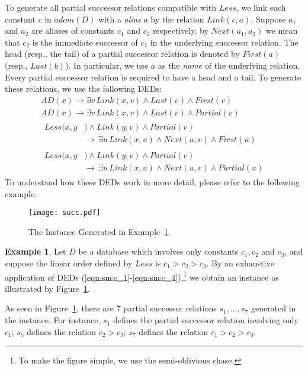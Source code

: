 \documentclass[letterpaper]{article} %
\theoremstyle{definition}
\theoremstyle{remark}
\theoremstyle{definition}
\newtheorem{exm}{Example}
\begin{document}
To generate all partial successor relations compatible with $\textit{Less}$, we link each constant $c$ in $adom(D)$ with a {\em alias} $a$ by the relation $\textit{Link}(c,a)$. Suppose $a_1$ and $a_2$ are aliases of constants $c_1$ and $c_2$ respectively, by $\textit{Next}(a_1,a_2)$ we mean that $c_2$ is the immediate successor of $c_1$ in the underlying successor relation. The head (resp., the tail) of a partial successor relation is denoted by $\textit{First}(a)$ (resp., $\textit{Last}(b)$). In particular, we use $a$ as the {\em name} of the underlying relation. Every partial successor relation is required to have a head and a tail. To generate these relations, we use the following DEDs:
\begin{eqnarray}
\label{eqn:succ_1}\textit{AD}(x)\rightarrow\exists v\,\textit{Link}(x,v)\wedge\textit{Last}(v)\wedge\textit{First}(v)\\
\label{eqn:succ_1}\textit{AD}(x)\rightarrow\exists v\,\textit{Link}(x,v)\wedge\textit{Last}(v)\wedge\textit{Partial}(v)\\
\label{eqn:succ_3}\begin{aligned}
\textit{Less}(x,y&)\wedge\textit{Link}(y,v)\wedge\textit{Partial}(v)\\
&\rightarrow\,\exists u\,\textit{Link}(x,u)\wedge\textit{Next}(u,v)\wedge\textit{First}(u)
\end{aligned}
\\
\label{eqn:succ_4}\begin{aligned}
\textit{Less}(x,y&)\wedge\textit{Link}(y,v)\wedge\textit{Partial}(v)\\
&\rightarrow\,\exists u\,\textit{Link}(x,u)\wedge\textit{Next}(u,v)\wedge\textit{Partial}(u)
\end{aligned}\end{eqnarray}
To understand how these DEDs work in more detail, please refer to the following example.
\begin{figure}[ht]
	\centering
	\texttt{[image: succ.pdf]}
	\caption{The Instance Generated in Example~\ref{exm:succ}.}\label{fig:succ}
\end{figure}

\begin{exm}\label{exm:succ}
Let $D$ be a database which involves only constants $c_1,c_2$ and $c_3$, and suppose the linear order defined by $\textit{Less}$ is $c_1>c_2>c_3$. By an exhaustive application of DEDs (\ref{eqn:succ_1}-\ref{eqn:succ_4}),\footnote{To make the figure simple, we use the semi-oblivious chase.} we obtain an instance as illustrated by Figure~\ref{fig:succ}.

As seen in Figure~\ref{fig:succ}, there are 7 partial successor relations $s_1,\dots,s_7$ generated in the instance. For instance, $s_1$ defines the partial successor relation involving only $c_1$; $s_5$ defines the relation $c_2>c_3$; $s_7$ defines the relation $c_1>c_2>c_3$.
\end{exm}
\end{document}
